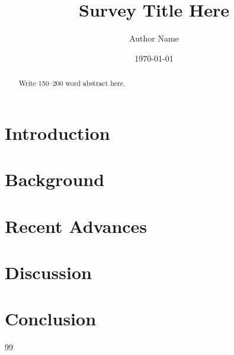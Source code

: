 \documentclass[12pt,a4paper]{article}
\title{Survey Title Here}
\author{Author Name}
\date{\today}
\begin{document}
\maketitle

\begin{abstract}
Write 150--200 word abstract here.
\end{abstract}

\section{Introduction}

\section{Background}

\section{Recent Advances}

\section{Discussion}

\section{Conclusion}


\begin{thebibliography}{99}


\end{thebibliography}
\end{document}
